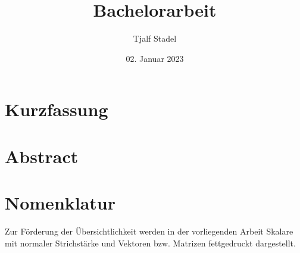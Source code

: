 \documentclass[
	final, 			%
	paper=a4, 		%
	pagesize=auto,	%
	fontsize=12pt, 	%
	ngerman, 		%
	openright,		%
	numbers=noendperiod,	%
]{scrreprt}
\title{Bachelorarbeit}
\author{Tjalf Stadel}
\date{02. Januar 2023}
\renewcommand{\baselinestretch}{1}\normalsize		%
\begin{document}

\addtocounter{page}{-1}

\newpage
\pagestyle{empty}
\phantom{t}										%
\addtocounter{page}{-1}

\newpage

\addtocounter{page}{-1}


\addtocounter{page}{-1}



\chapter*{Kurzfassung}

\newpage
\chapter*{Abstract}
\newpage
\renewcommand*{\chapterheadstartvskip}{\vspace*{2.3\baselineskip}}	%
\renewcommand{\baselinestretch}{1.2}\normalsize						%
\tableofcontents													%
\renewcommand{\baselinestretch}{1.25}\normalsize					%
\renewcommand*{\chapterheadstartvskip}{\vspace*{2.3\baselineskip}}	%
\chapter*{Nomenklatur}
Zur Förderung der Übersichtlichkeit werden in der vorliegenden Arbeit Skalare mit normaler Strichstärke und Vektoren bzw. Matrizen fettgedruckt dargestellt.
\renewcommand{\baselinestretch}{1.1}\normalsize						%

\renewcommand{\baselinestretch}{1.25}\normalsize					%
\end{document}
